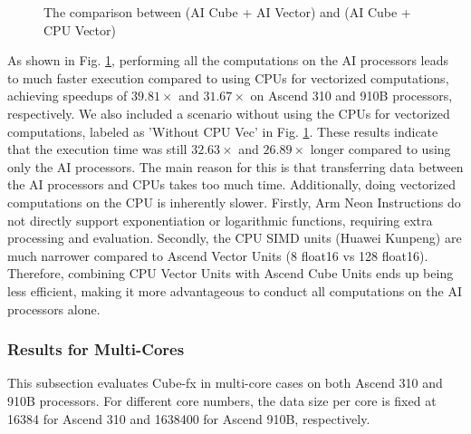 \begin{figure}[tbp]
    \caption{The comparison between (AI Cube + AI Vector) and (AI Cube + CPU Vector)}
    \label{fig:cpu_ai}
    \end{figure}
  
As shown in Fig. \ref{fig:cpu_ai}, performing all the computations on the AI processors leads to much faster execution compared to using CPUs for vectorized computations, achieving speedups of $39.81\times$ and $31.67\times$ on Ascend 310 and 910B processors, respectively. We also included a scenario without using the CPUs for vectorized computations, labeled as 'Without CPU Vec' in Fig. \ref{fig:cpu_ai}. These results indicate that the execution time was still $32.63\times$ and $26.89\times$ longer compared to using only the AI processors. The main reason for this is that transferring data between the AI processors and CPUs takes too much time. Additionally, doing vectorized computations on the CPU is inherently slower. Firstly, Arm Neon Instructions do not directly support exponentiation or logarithmic functions, requiring extra processing and evaluation. Secondly, the CPU SIMD units (Huawei Kunpeng) are much narrower compared to Ascend Vector Units (8 float16 \cite{kunpeng} vs 128 float16). Therefore, combining CPU Vector Units with Ascend Cube Units ends up being less efficient, making it more advantageous to conduct all computations on the AI processors alone.

\subsubsection{Results for Multi-Cores}

This subsection evaluates Cube-fx in multi-core cases on both Ascend 310 and 910B processors. For different core numbers, the data size per core is fixed at 16384 for Ascend 310 and 1638400 for Ascend 910B, respectively.

